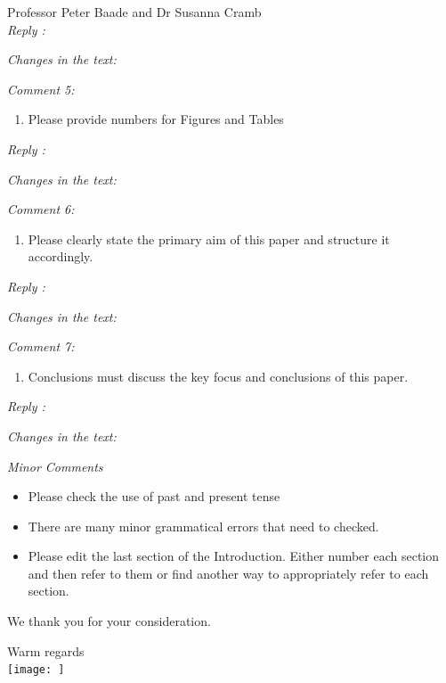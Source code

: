 \documentclass[11pt,a4paper,]{letter}
\providecommand{\tightlist}{%
  \setlength{\itemsep}{0pt}\setlength{\parskip}{0pt}}
\begin{document}
\begin{letter}{Professor Peter Baade and Dr Susanna Cramb\\}
\emph{Reply :}

\emph{Changes in the text:}

\emph{Comment 5: }

\begin{enumerate}
\def\labelenumi{\arabic{enumi}.}
\setcounter{enumi}{4}
\tightlist
\item
  Please provide numbers for Figures and Tables
\end{enumerate}

\emph{Reply :}

\emph{Changes in the text:}

\emph{Comment 6: }

\begin{enumerate}
\def\labelenumi{\arabic{enumi}.}
\setcounter{enumi}{5}
\tightlist
\item
  Please clearly state the primary aim of this paper and structure it accordingly.
\end{enumerate}

\emph{Reply :}

\emph{Changes in the text:}

\emph{Comment 7: }

\begin{enumerate}
\def\labelenumi{\arabic{enumi}.}
\setcounter{enumi}{6}
\tightlist
\item
  Conclusions must discuss the key focus and conclusions of this paper.
\end{enumerate}

\emph{Reply :}

\emph{Changes in the text:}

\emph{Minor Comments}

\begin{itemize}
\tightlist
\item
  Please check the use of past and present tense
\item
  There are many minor grammatical errors that need to checked.
\item
  Please edit the last section of the Introduction. Either number each section and then refer to them or find another way to appropriately refer to each section.
\end{itemize}

We thank you for your consideration.
\closing{Warm regards\\[0.2cm]\hspace*{0.5cm}\texttt{[image: ]}}
\end{letter}
\end{document}
